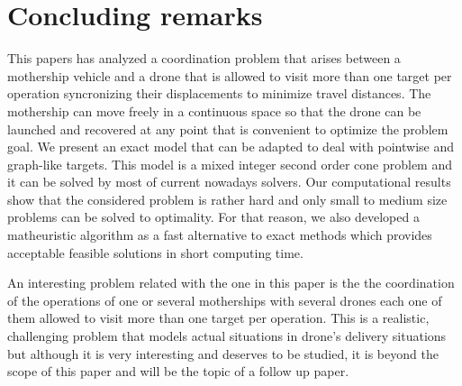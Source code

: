 \section{Concluding remarks} \label{conclusions}
This papers has analyzed a coordination problem that arises between a mothership vehicle and a drone that is allowed to visit more than one target per operation syncronizing their displacements to minimize travel distances. The mothership can move freely in a continuous space so that the drone can be launched and recovered at any point that is convenient to optimize the problem goal. We present an exact model that  can be adapted to deal with pointwise and graph-like targets. This model is a mixed integer second order cone problem and it can be solved by most of current nowadays solvers. Our computational results show that the considered problem is rather hard and only small to medium size problems can be  solved to optimality. For that reason, we also developed a matheuristic algorithm as a fast alternative to exact methods which provides acceptable feasible solutions in short computing time.

An interesting problem related with the one in this paper is the  the coordination of the operations of one or several motherships with several drones each one of them  allowed to visit more than one target per operation. This is a realistic, challenging  problem that models actual situations in drone's delivery situations but although it is very interesting and deserves to be studied, it  is beyond the scope of this paper and will be the topic of a follow up paper.